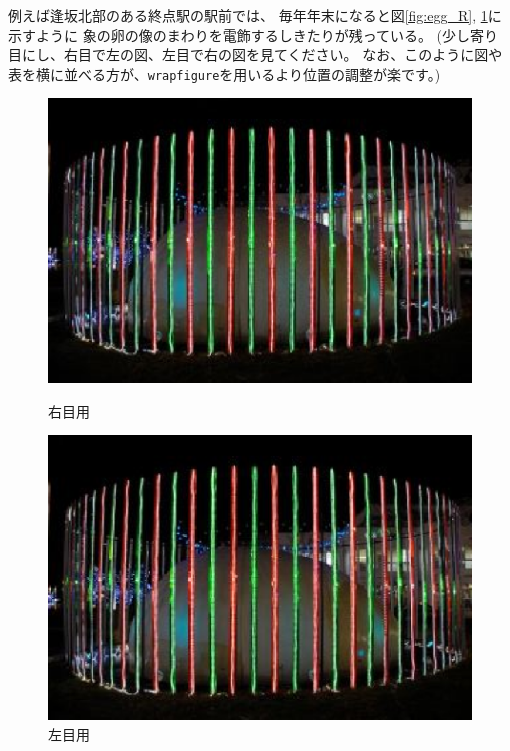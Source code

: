 \documentclass[11pt,a4paper,twoside]{jarticle}
\newcommand{\研究種別}{A}	%
\newcommand{\研究課題名}{コ・クリエイティブなソフトウェア開発のPBL型教育}
\newcommand{\研究機関名}{産業技術大学院大学}
\newcommand{\研究代表者氏名}{中鉢　欣秀}
\newcommand{\研究代表者氏名ふりがな}{ちゅうばち　よしひで}
\newcommand{\本応募effort}{\KLEffort{18}}	%
\newcommand{\研究期間の最終元号年度}{27}	%
\begin{document}
{	例えば逢坂北部のある終点駅の駅前では、
	毎年年末になると図\ref{fig:egg_R}, \ref{fig:egg_L}に示すように
	象の卵の像のまわりを電飾するしきたりが残っている。
	(少し寄り目にし、右目で左の図、左目で右の図を見てください。
	なお、このように図や表を横に並べる方が、{\tt wrapfigure}を用いるより位置の調整が楽です。)
        \begin{figure}[h]
         	\begin{minipage}[t]{0.49\linewidth}
			\includegraphics[width=\linewidth]{figs/egg_R.eps}
			\caption{右目用}
			\label{fig:egg_R}
		\end{minipage}
		\hspace{0.01\linewidth}
		\begin{minipage}[t]{0.49\linewidth}
			\includegraphics[width=\linewidth]{figs/egg_L.eps}
			\caption{左目用}
			\label{fig:egg_L}
		\end{minipage}
         \end{figure}

}
\end{document}
